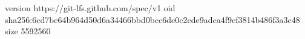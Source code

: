 version https://git-lfs.github.com/spec/v1
oid sha256:6cd7be64b964d50d6a34466bbd0bcc6de0c2cde9adca4f9cf3814b486f3a3c48
size 5592560

